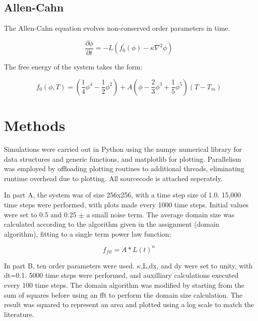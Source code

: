\documentclass{report}
\begin{document}
    \subsection{Allen-Cahn}
    The Allen-Cahn equation evolves non-conserved order parameters in time.

    \begin{equation} \label{allen-cahn}
        \frac{\partial \phi}{\partial t} = -L(f^{'}_{0}(\phi) - \kappa \nabla^{2}\phi)
    \end{equation}

    The free energy of the system takes the form:

    \begin{equation} \label{free}
        f_{0}(\phi,T) = (\frac{1}{4}\phi^{4} - \frac{1}{2}\phi^{2}) + A(\phi - \frac{2}{3}\phi^{3}
 + \frac{1}{5}\phi^{5})(T - T_{m})
    \end{equation}



    \section{Methods}
    Simulations were carried out in Python using the numpy numerical library for data structures and generic functions, and matplotlib for plotting.  Parallelism was employed by offloading plotting routines to additional threads, eliminating runtime overhead due to plotting. All sourcecode is attached seperately.

    In part A, the system was of size 256x256, with a time step size of 1.0.  15,000 time steps were performed, with plots made every 1000 time steps. Initial values were set to 0.5 and 0.25 $\pm$ a small noise term. The average domain size was calculated according to the algorithm given in the assignment (domain algorithm), fitting to a single term power law function:

    \begin{equation} \label{fit}
        f_{fit} = A*L(t)^{n}
    \end{equation}

    In part B, ten order parameters were used.  $\kappa$,L,dx, and dy were set to unity, with dt=0.1. 5000 time steps were performed, and auxilliary calculations executed every 100 time steps. The domain algorithm was modified by starting from the sum of squares before using an fft to perform the domain size calculation.  The result was squared to represent an area and plotted using a log scale to match the literature\cite{CHEN}.
\end{document}
